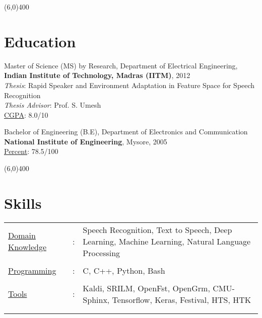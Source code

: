 \documentclass[line,margin]{res}
\begin{document}
\begin{resume}
\normalsize
\vspace{-5mm}
\line(6,0){400}



\section{Education} 
\small
Master of Science (MS) by Research, Department of Electrical Engineering, \\{\bf Indian Institute of Technology, Madras (IITM)}, 2012  \\
\emph{Thesis}: Rapid Speaker and Environment Adaptation in Feature Space for Speech Recognition \\
\emph{Thesis Advisor}: Prof. S. Umesh \\
\underline {CGPA}: 8.0/10 

Bachelor of Engineering (B.E), Department of Electronics and Communication \\ {\bf National Institute of Engineering}, Mysore, 2005 \\
\underline {Percent}: 78.5/100 

\line(6,0){400}

\section{Skills}
\small
   \begin{tabular}{l c p{3in}}\vspace{-4mm}
   \hspace{-3mm} \underline{Domain Knowledge} & :&   Speech Recognition, Text to Speech, Deep Learning, Machine Learning, Natural Language Processing \\ \\ \vspace{-4mm}
   \hspace{-3mm} \underline{Programming} & :&   C, C++, Python, Bash \\ \\ \vspace{-4mm}
   \hspace{-3mm} \underline{Tools} & :&   Kaldi, SRILM, OpenFst, OpenGrm, CMU-Sphinx, Tensorflow, Keras, Festival, HTS, HTK \\ \\ \vspace{-4mm}
 \end{tabular}
\normalsize


\end{resume}
\end{document}
